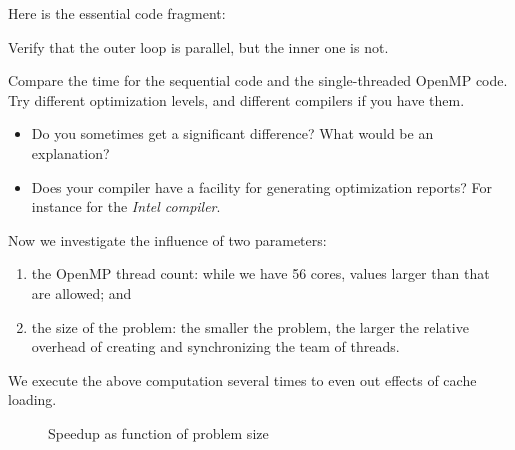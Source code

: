 Here is the essential code fragment:

\begin{exercise}
  Verify that the outer loop is parallel, but the inner one is not.
\end{exercise}

\begin{exercise}
  Compare the time for the sequential code and the single-threaded OpenMP code.
  Try different optimization levels, and different compilers if you have them.
  \begin{itemize}
  \item
    Do you sometimes get a significant difference? What would be an explanation?
  \item Does your compiler have a facility for generating optimization reports?
    For instance  for the
    \emph{Intel compiler}.
  \end{itemize}
\end{exercise}

Now we investigate the influence of two parameters:
\begin{enumerate}
\item the OpenMP thread count: while we have 56 cores, values larger than that are allowed; and
\item the size of the problem: the smaller the problem, the larger the relative overhead
  of creating and synchronizing the team of threads.
\end{enumerate}
We execute the above computation several times to even out effects of cache loading.

\begin{figure}[t]
  \caption{Speedup as function of problem size}
  \label{fig:omp-speedup}
\end{figure}


